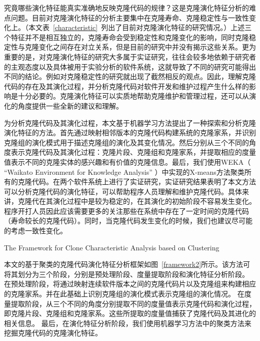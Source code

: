 究竟哪些演化特征能真实准确地反映克隆代码的规律？这是克隆演化特征分析的难点问题。目前对克隆演化特征的分析主要集中在克隆寿命、克隆稳定性与一致性变化上。（本文表~\ref{characteristic}~列出了目前对克隆演化特征的研究情况。）上述三个特征并不是相互独立的，克隆寿命会受到稳定性和克隆变化的影响，同时克隆稳定性与克隆变化之间存在对立关系，但是目前的研究中并没有揭示这些关系。更为重要的是，对克隆演化特征的研究大多属于实证研究，往往会较多地依赖于研究者的主观态度以及具体被用于实验分析的软件系统，这就导致了不同的研究可能得出不同的结论。例如对克隆稳定性的研究就出现了截然相反的观点。因此，理解克隆代码的存在及其演化过程，并分析克隆代码对软件开发和维护过程产生什么样的影响是十分必要的。克隆演化特征可以实质地帮助克隆维护和管理过程，还可以从演化的角度提供一些全新的建议和理解。

为分析克隆代码及其演化过程，本文基于机器学习方法提出了一种探索和分析克隆演化特征的方法。首先通过映射相邻版本的克隆代码构建系统的克隆家系，并识别克隆组的演化模式用于描述克隆组的演化及其变化情况。然后分别从三个不同的角度表示克隆代码及其演化过程：克隆片段、克隆组和克隆家系，并提取相应的度量值表示不同的克隆实体的感兴趣和有价值的克隆信息。最后，我们使用WEKA（ “Waikato Environment for Knowledge Analysis” \cite{hall2009weka}）中实现的X-means\cite{pelleg2000x}方法聚类所有的克隆代码。在两个软件系统上进行了实证研究，实证研究结果表明了本文方法可以分析克隆代码的演化特征，可以帮助程序人员理解和维护克隆代码。具体来讲，克隆代在其演化过程中是较为稳定的，在其演化的初始阶段不容易发生变化。程序开打人员因此应该需要更多的关注那些在系统中存在了一定时间的克隆代码（寿命较长的克隆代码）。同时，当克隆代码发生变化的时候，我们也建议尽可能的考虑一致性变化。


{The Framework for Clone Characteristic Analysis based on Clustering}

本文的基于聚类的克隆代码演化特征分析框架如图~\ref{framework2}所示。该方法可将其划分为三个阶段，分别是预处理阶段、度量提取阶段和演化特征分析阶段。 在预处理阶段，将通过映射连续软件版本之间的克隆代码片以及克隆组来构建相应的克隆家系。并在此基础上识别克隆组的演化模式表示克隆组的演化情况。 在度量提取阶段，从三个不同的角度分别提取不同的度量值表示克隆代码和演化过程，即克隆片段、克隆组和克隆家系。这些所提取的度量值捕获了克隆代码及其进化的相关信息。 最后，在演化特征分析阶段，我们使用机器学习方法中的聚类方法来挖掘克隆代码的克隆演化特征。

